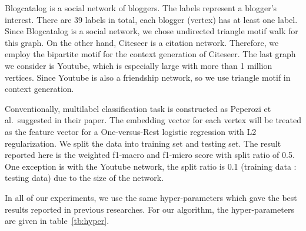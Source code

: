 \documentclass[letterpaper]{article}
\begin{document}
            Blogcatalog \cite{blogcatalog} is a social network of bloggers. The labels represent
            a blogger's interest. There are 39 labels in total, each blogger (vertex) has at least
            one label. Since Blogcatalog is a social network, we chose undirected triangle motif
            walk for this graph. On the other hand, Citeseer \cite{planetoid} 
            is a citation network. Therefore, we employ the bipartite motif for the context generation
            of Citeseer. The last graph we consider is Youtube, which is especially
            large with more than 1 million vertices. Since Youtube is also a friendship network,
            so we use triangle motif in context generation.

            Conventionally, multilabel classification task is constructed as Peperozi et al.\ suggested
            in their paper. The embedding vector for each vertex will be treated as the feature
            vector for a One-versus-Rest logistic regression with L2 regularization. We split the 
            data into training set and testing set. The result reported here is the weighted f1-macro and
            f1-micro score with split ratio of 0.5. One exception is with the Youtube network, the
            split ratio is 0.1 (training data : testing data) due to the size of the network.

            In all of our experiments, we use the same hyper-parameters which gave the best 
            results reported in previous researches. For our algorithm, the hyper-parameters
            are given in table~\ref{tb:hyper}.

            \begin{table}
                \centering
                \label{tb:hyper}
                \caption{MAGE Hyper-parameters}
            \end{table}
\end{document}
